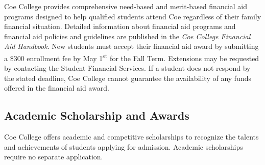 \documentclass[
  letterpaper,
]{scrbook}
\begin{document}
Coe College provides comprehensive need-based and merit-based financial
aid programs designed to help qualified students attend Coe regardless
of their family financial situation. Detailed information about
financial aid programs and financial aid policies and guidelines are
published in the \emph{Coe College Financial Aid Handbook}. New students
must accept their financial aid award by submitting a \$300 enrollment
fee by May 1\textsuperscript{st} for the Fall Term. Extensions may be
requested by contacting the Student Financial Services. If a student
does not respond by the stated deadline, Coe College cannot guarantee
the availability of any funds offered in the financial aid award.

\hypertarget{academic-scholarship-and-awards}{%
\subsection{Academic Scholarship and
Awards}\label{academic-scholarship-and-awards}}

Coe College offers academic and competitive scholarships to recognize
the talents and achievements of students applying for admission.
Academic scholarships require no separate application.
\end{document}

